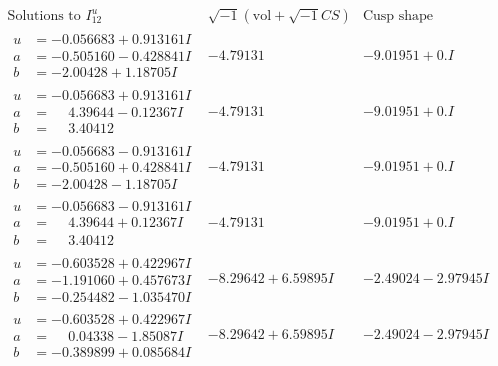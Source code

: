 \documentclass[1p]{elsarticle_modified}
\theoremstyle{definition}
\newcommand{\I}{\sqrt{-1}}
\begin{document}
$$\begin{array}{c|c|c}  
\text{Solutions to }I^u_{12}& \I (\text{vol} + \sqrt{-1}CS) & \text{Cusp shape}\\
 \hline 
\begin{aligned}
u &= -0.056683 + 0.913161 I \\
a &= -0.505160 - 0.428841 I \\
b &= -2.00428 + 1.18705 I\end{aligned}
 & -4.79131\phantom{ +0.000000I} & -9.01951 + 0. I\phantom{ +0.000000I} \\ \hline\begin{aligned}
u &= -0.056683 + 0.913161 I \\
a &= \phantom{-}4.39644 - 0.12367 I \\
b &= \phantom{-}3.40412\phantom{ +0.000000I}\end{aligned}
 & -4.79131\phantom{ +0.000000I} & -9.01951 + 0. I\phantom{ +0.000000I} \\ \hline\begin{aligned}
u &= -0.056683 - 0.913161 I \\
a &= -0.505160 + 0.428841 I \\
b &= -2.00428 - 1.18705 I\end{aligned}
 & -4.79131\phantom{ +0.000000I} & -9.01951 + 0. I\phantom{ +0.000000I} \\ \hline\begin{aligned}
u &= -0.056683 - 0.913161 I \\
a &= \phantom{-}4.39644 + 0.12367 I \\
b &= \phantom{-}3.40412\phantom{ +0.000000I}\end{aligned}
 & -4.79131\phantom{ +0.000000I} & -9.01951 + 0. I\phantom{ +0.000000I} \\ \hline\begin{aligned}
u &= -0.603528 + 0.422967 I \\
a &= -1.191060 + 0.457673 I \\
b &= -0.254482 - 1.035470 I\end{aligned}
 & -8.29642 + 6.59895 I & -2.49024 - 2.97945 I \\ \hline\begin{aligned}
u &= -0.603528 + 0.422967 I \\
a &= \phantom{-}0.04338 - 1.85087 I \\
b &= -0.389899 + 0.085684 I\end{aligned}
 & -8.29642 + 6.59895 I & -2.49024 - 2.97945 I \\ \hline\begin{aligned}

\end{aligned}
\end{array}$$
\end{document}
